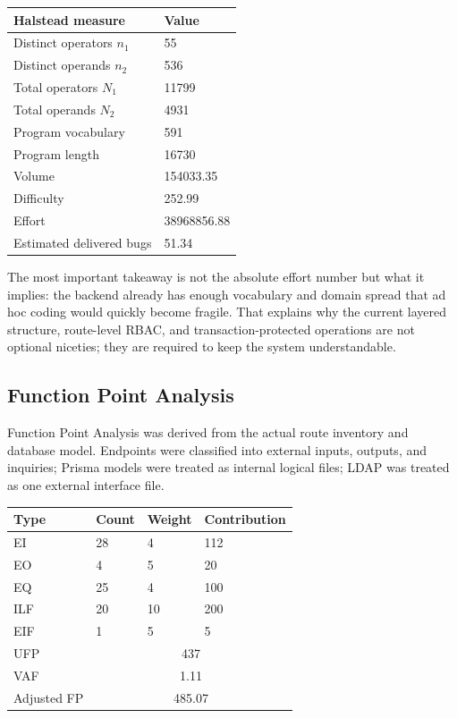 \documentclass[11pt,a4paper]{article}
\begin{document}
\begin{center}
\begin{tabular}{|p{7cm}|p{4cm}|}
\hline
\rowcolor{SoftBlue}
\textbf{Halstead measure} & \textbf{Value} \\
\hline
Distinct operators \(n_1\) & 55 \\
Distinct operands \(n_2\) & 536 \\
Total operators \(N_1\) & 11799 \\
Total operands \(N_2\) & 4931 \\
Program vocabulary & 591 \\
Program length & 16730 \\
Volume & 154033.35 \\
Difficulty & 252.99 \\
Effort & 38968856.88 \\
Estimated delivered bugs & 51.34 \\
\hline
\end{tabular}
\end{center}

The most important takeaway is not the absolute effort number but what it implies: the backend already has enough vocabulary and domain spread that ad hoc coding would quickly become fragile. That explains why the current layered structure, route-level RBAC, and transaction-protected operations are not optional niceties; they are required to keep the system understandable.

\subsection{Function Point Analysis}
Function Point Analysis was derived from the actual route inventory and database model. Endpoints were classified into external inputs, outputs, and inquiries; Prisma models were treated as internal logical files; LDAP was treated as one external interface file.

\begin{center}
\begin{tabular}{|p{3cm}|p{2.2cm}|p{2.2cm}|p{2.4cm}|}
\hline
\rowcolor{SoftBlue}
\textbf{Type} & \textbf{Count} & \textbf{Weight} & \textbf{Contribution} \\
\hline
EI & 28 & 4 & 112 \\
EO & 4 & 5 & 20 \\
EQ & 25 & 4 & 100 \\
ILF & 20 & 10 & 200 \\
EIF & 1 & 5 & 5 \\
\hline
UFP & \multicolumn{3}{c|}{437} \\
VAF & \multicolumn{3}{c|}{1.11} \\
Adjusted FP & \multicolumn{3}{c|}{485.07} \\
\hline
\end{tabular}
\end{center}
\end{document}
